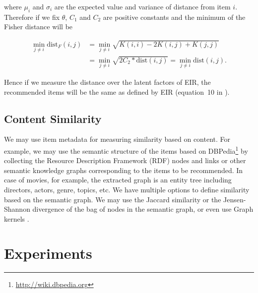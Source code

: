 where $\mu_i$ and $\sigma_i$ are the expected value and variance of distance from item $i$. Therefore if we fix $\theta$, $C_1$ and $C_2$ are positive constants and the minimum of the 
Fisher distance will be %

\begin{equation}
\nonumber
\begin{split}
\min_{j \neq i} \text{dist}_F(i,j) &= \min_{j \neq i} \sqrt{K(i,i) - 2 K(i,j) + K(j,j)} \\
                   &= \min_{j \neq i} \sqrt{2C_2*\mbox{dist}(i,j)} = \min_{j \neq i} \mbox{dist}(i,j).
\end{split}
\end{equation}

Hence if we measure the distance over the latent factors of EIR, the recommended items will be the same as defined by EIR (equation~10 in \cite{koenigstein2013towards}).

\subsection{Content Similarity}

We may use item metadata for measuring similarity based on content.
For example, we may use the semantic structure of the items based on DBPedia\footnote{\url{http://wiki.dbpedia.org}} \cite{auer2007dbpedia} by collecting the 
Resource Description Framework (RDF) nodes and links or other semantic knowledge graphs corresponding to the items to be recommended.  %
In case of movies, for example, the extracted graph is an entity tree including directors, actors, genre, topics, etc. We have multiple options to define  similarity based on the semantic graph.
We may use the Jaccard similarity or the Jensen-Shannon divergence of the bag of nodes in the semantic graph, or even use Graph kernels \cite{losch2012graph}.

%
%

\section{Experiments}

